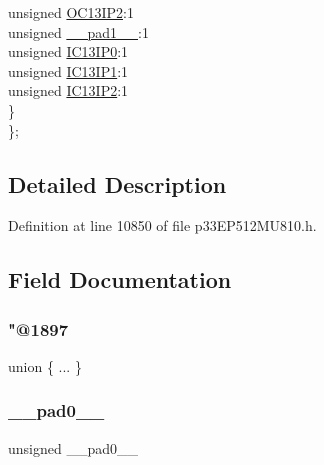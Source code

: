 \begin{DoxyCompactItemize}
\begin{tabbing}
\>\>unsigned \hyperlink{structtag_i_p_c33_b_i_t_s_aab94968abd05da19d352f84d7acf54e9}{OC13IP2}:1\\
\>\>unsigned \hyperlink{structtag_i_p_c33_b_i_t_s_acaf2d0924a107ec6e8d2e31febaf66f9}{\_\_pad1\_\_}:1\\
\>\>unsigned \hyperlink{structtag_i_p_c33_b_i_t_s_a579ece85d3be2e688a764a28492f3b3e}{IC13IP0}:1\\
\>\>unsigned \hyperlink{structtag_i_p_c33_b_i_t_s_a00e7b22517aff19bb5bef8d2fb6a8bc1}{IC13IP1}:1\\
\>\>unsigned \hyperlink{structtag_i_p_c33_b_i_t_s_aa7b4239400650fa97a3dbff5df87605e}{IC13IP2}:1\\
\>\} \\
\}; \\

\end{tabbing}\end{DoxyCompactItemize}


\subsection{Detailed Description}


Definition at line 10850 of file p33\+E\+P512\+M\+U810.\+h.



\subsection{Field Documentation}
\mbox{\label{structtag_i_p_c33_b_i_t_s_a8f447a5e3a366258e3a05243ba0d8ee8}} 
\subsubsection{\texorpdfstring{"@1897}{@1897}}
{\footnotesize\ttfamily union \{ ... \} }

\mbox{\label{structtag_i_p_c33_b_i_t_s_adf71f3d8410c1f1dbbc96680a92c49af}} 
\subsubsection{\texorpdfstring{\+\_\+\+\_\+pad0\+\_\+\+\_\+}{\_\_pad0\_\_}}
{\footnotesize\ttfamily unsigned \+\_\+\+\_\+pad0\+\_\+\+\_\+}



